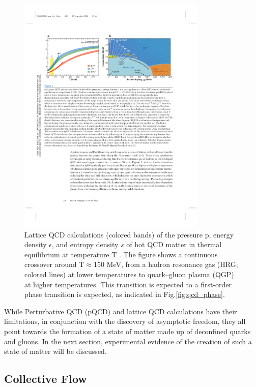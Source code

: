 \begin{figure}[htpb]
  \centering
  \includegraphics[width=0.8\textwidth]{Introduction/lattice_qcd.pdf}
  \caption{Lattice QCD calculations (colored bands) of the pressure p, energy density $\epsilon$, and entropy density $s$ of hot QCD matter in thermal equilibrium at temperature T \cite{Borsanyi2014,HotQCDCollaboration2014}. The figure shows a continuous crossover around T$\approx$150 MeV, from a hadron resonance gas (HRG; colored lines) at lower temperatures to quark–gluon plasma (QGP) at higher temperatures. This transition is expected to a  first-order phase transition is expected, as indicated in Fig.\ref{fig:qcd_phase}\cite{annurev-nucl}.}
  \label{fig:lattice_qcd}
\end{figure}


While Perturbative QCD (pQCD) and lattice QCD calculations have their limitations, in conjunction with the discovery of asymptotic freedom, they all point towards the formation of a state of matter made up of deconfined quarks and gluons. In the next section, experimental evidence of the creation of such a state of matter will be discussed. 

\subsection{Collective Flow}\label{sec:flow}

